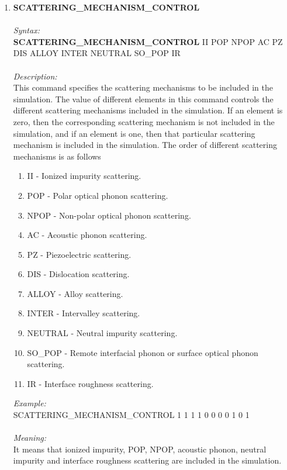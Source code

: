 \documentclass[12pt]{article}
\begin{document}
\begin{enumerate}
    \item \textbf{SCATTERING\_MECHANISM\_CONTROL}  \\ \\
    \textit{Syntax:} \\
    \textbf{SCATTERING\_MECHANISM\_CONTROL} II POP NPOP AC PZ DIS ALLOY INTER NEUTRAL SO\_POP IR \\ \\
    \textit{Description:} \\
    This command specifies the scattering mechanisms to be included in the simulation. The value of different elements in this command controls the different scattering mechanisms included in the simulation. If an element is zero, then the corresponding scattering mechanism is not included in the simulation, and if an element is one, then that particular scattering mechanism is included in the simulation. The order of different scattering mechanisms is as follows 
    \begin{enumerate}
        \item II - Ionized impurity scattering.
        \item POP - Polar optical phonon scattering.
        \item NPOP - Non-polar optical phonon scattering.
        \item AC - Acoustic phonon scattering.
        \item PZ - Piezoelectric scattering.
        \item DIS - Dislocation scattering.
        \item ALLOY - Alloy scattering.
        \item INTER - Intervalley scattering.
        \item NEUTRAL - Neutral impurity scattering. 
        \item SO\_POP - Remote interfacial phonon or surface optical phonon scattering.
        \item IR - Interface roughness scattering.
    \end{enumerate}

    \textit{Example:} \\
    SCATTERING\_MECHANISM\_CONTROL 1 1 1 1 0 0 0 0 1 0 1 \\ \\
    \textit{Meaning:} \\    
    It means that ionized impurity, POP, NPOP, acoustic phonon, neutral impurity and interface roughness scattering are included in the simulation. \\ \\
    

\end{enumerate}
\end{document}
